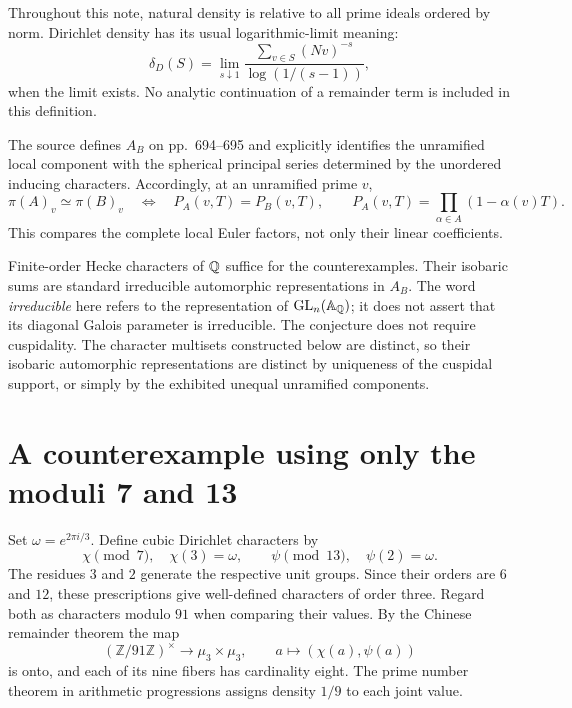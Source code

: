 \documentclass[11pt]{article}
\theoremstyle{remark}\newtheorem{remark}[theorem]{Remark}
\newcommand{\GL}{\mathrm{GL}}\newcommand{\SU}{\mathrm{SU}}\newcommand{\tr}{\operatorname{tr}}
\begin{document}
Throughout this note, natural density is relative to all prime ideals ordered by norm. Dirichlet density has its usual logarithmic-limit meaning:
\[
 \delta_D(S)=\lim_{s\downarrow1}
 \frac{\sum_{v\in S}(Nv)^{-s}}{\log(1/(s-1))},
\]
when the limit exists. No analytic continuation of a remainder term is included in this definition.

The source defines $A_B$ on pp.~694--695 and explicitly identifies the unramified local component with the spherical principal series determined by the unordered inducing characters. Accordingly, at an unramified prime $v$,
\begin{equation}\label{eq:local}
 \pi(A)_v\simeq\pi(B)_v
 \quad\Longleftrightarrow\quad
 P_A(v,T)=P_B(v,T),\qquad
 P_A(v,T)=\prod_{\alpha\in A}(1-\alpha(v)T).
\end{equation}
This compares the complete local Euler factors, not only their linear coefficients.

Finite-order Hecke characters of $\mathbb Q$ suffice for the counterexamples. Their isobaric sums are standard irreducible automorphic representations in $A_B$. The word \emph{irreducible} here refers to the representation of $\GL_n(\mathbb A_\Q)$; it does not assert that its diagonal Galois parameter is irreducible. The conjecture does not require cuspidality. The character multisets constructed below are distinct, so their isobaric automorphic representations are distinct by uniqueness of the cuspidal support, or simply by the exhibited unequal unramified components.

\section{A counterexample using only the moduli 7 and 13}

Set $\omega=e^{2\pi i/3}$. Define cubic Dirichlet characters by
\begin{equation}\label{eq:chars}
 \chi\pmod7,\quad \chi(3)=\omega,
 \qquad
 \psi\pmod{13},\quad \psi(2)=\omega.
\end{equation}
The residues $3$ and $2$ generate the respective unit groups. Since their orders are $6$ and $12$, these prescriptions give well-defined characters of order three. Regard both as characters modulo $91$ when comparing their values. By the Chinese remainder theorem the map
\[
 (\mathbb Z/91\mathbb Z)^\times\longrightarrow\mu_3\times\mu_3,
 \qquad a\longmapsto(\chi(a),\psi(a))
\]
is onto, and each of its nine fibers has cardinality eight. The prime number theorem in arithmetic progressions assigns density $1/9$ to each joint value.
\end{document}
